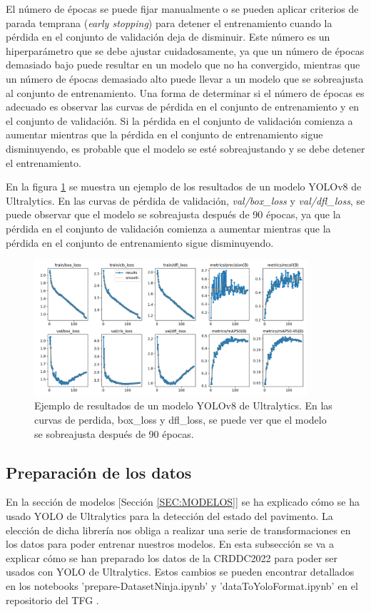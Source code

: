 El número de épocas se puede fijar manualmente o se pueden aplicar criterios de parada temprana (\textit{early stopping}) para detener el entrenamiento cuando la pérdida en el conjunto de validación deja de disminuir. Este número es un hiperparámetro que se debe ajustar cuidadosamente, ya que un número de épocas demasiado bajo puede resultar en un modelo que no ha convergido, mientras que un número de épocas demasiado alto puede llevar a un modelo que se sobreajusta al conjunto de entrenamiento. Una forma de determinar si el número de épocas es adecuado es observar las curvas de pérdida en el conjunto de entrenamiento y en el conjunto de validación. Si la pérdida en el conjunto de validación comienza a aumentar mientras que la pérdida en el conjunto de entrenamiento sigue disminuyendo, es probable que el modelo se esté sobreajustando y se debe detener el entrenamiento.

En la figura \ref{fig:example_results} se muestra un ejemplo de los resultados de un modelo YOLOv8 de Ultralytics. En las curvas de pérdida de validación, \textit{val/box\_loss} y \textit{val/dfl\_loss}, se puede observar que el modelo se sobreajusta después de 90 épocas, ya que la pérdida en el conjunto de validación comienza a aumentar mientras que la pérdida en el conjunto de entrenamiento sigue disminuyendo.

\begin{figure}[H]
    \centering
    \includegraphics[width=0.9\textwidth]{graphs/example_results.png}
    \caption{Ejemplo de resultados de un modelo YOLOv8 de Ultralytics. En las curvas de perdida, box\_loss y dfl\_loss, se puede ver que el modelo se sobreajusta después de 90 épocas.}
    \label{fig:example_results}
\end{figure}

\subsection{Preparación de los datos}
En la sección de modelos [Sección \ref{SEC:MODELOS}] se ha explicado cómo se ha usado YOLO de Ultralytics para la detección del estado del pavimento. La elección de dicha librería nos obliga a realizar una serie de transformaciones en los datos para poder entrenar nuestros modelos. En esta subsección se va a explicar cómo se han preparado los datos de la CRDDC2022 para poder ser usados con YOLO de Ultralytics. Estos cambios se pueden encontrar detallados en los notebooks 'prepare-DatasetNinja.ipynb' y 'dataToYoloFormat.ipynb' en el repositorio del TFG \cite{TFG_Repository}.

